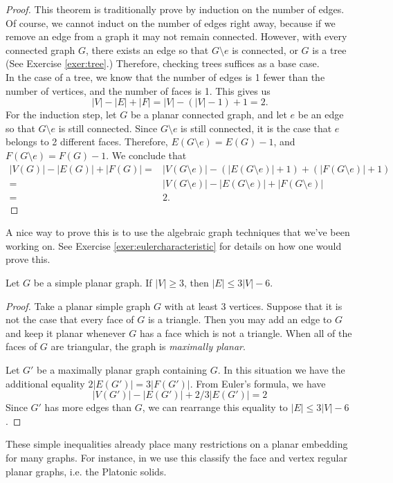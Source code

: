 \begin{proof}
 This theorem is traditionally prove by induction on the number of edges. Of course, we cannot induct on the number of edges right away, because if we remove an edge from a graph it may not remain connected. However, with every connected graph $G$, there exists an edge so that $G\setminus e$ is connected, or $G$ is a tree (See Exercise \ref{exer:tree}.) Therefore, checking trees suffices as a base case.\\
 In the case of a tree, we know that the number of edges is 1 fewer than the number of vertices, and the number of faces is 1. This gives us 
 \[|V|-|E|+|F|=|V|-(|V|-1)+1=2.\]
 For the induction step, let $G$ be a planar connected graph, and let $e$ be an edge so that $G\setminus e$ is still connected. Since $G\setminus e$ is still connected, it is the case that $e$ belongs to 2 different faces. Therefore, $E(G\setminus e)=E(G)-1$, and $F(G\setminus e)=F(G)-1$. We conclude that 
 \begin{align*}
 |V(G)|-|E(G)|+|F(G)|= &|V(G\setminus e)|-(|E(G\setminus e)|+1)+(|F(G\setminus e)|+1)\\
 =&|V(G\setminus e)|-|E(G\setminus e)|+|F(G\setminus e)|\\
 =&2.
 \end{align*}
\end{proof}
A nice way to prove this is to use the algebraic graph techniques that we've been working on. See Exercise \ref{exer:eulercharacteristic} for details on how one would prove this. 
\begin{corollary}
Let $G$ be a simple planar graph. If $|V|\geq 3$, then $|E|\leq 3|V|-6$. 
\label{emb:cor:inequality}
\end{corollary}
\begin{proof}
 Take a planar simple graph $G$ with at least 3 vertices. Suppose that it is not the case that every face of $G$ is a triangle. Then you may add an edge to $G$ and keep it planar whenever $G$ has a face which is not a triangle. When all of the faces of $G$ are triangular, the graph is \emph{maximally planar}.

 Let $G'$ be a maximally planar graph containing $G$. In this situation we have the additional equality $2|E(G')|=3|F(G')|$. From Euler's formula, we have 
 \[|V(G')|-|E(G')|+2/3 |E(G')|=2\]
Since $G'$ has more edges than $G$, we can rearrange this equality to $|E|\leq 3|V|-6$. 
\end{proof}
These simple inequalities already place many restrictions on a planar embedding for many graphs. For instance, in  we use this classify the face and vertex regular planar graphs, i.e. the Platonic solids. 


